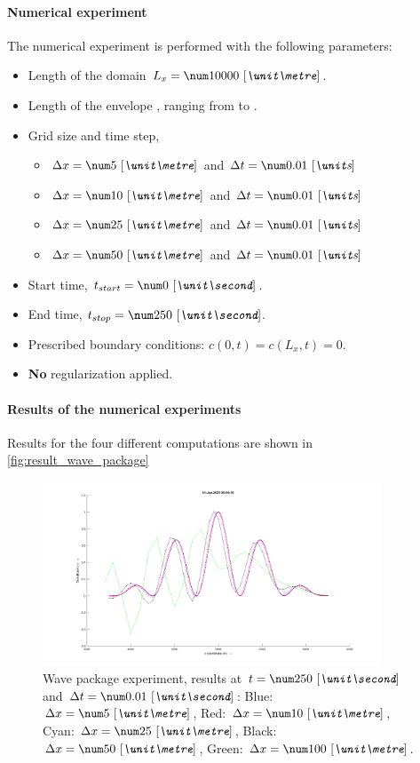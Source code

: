 \paragraph*{Numerical experiment}
The numerical experiment is performed with the following parameters:
\begin{itemize}
    \item Length of the domain $L_x = \bqty{10000}{\metre}$.
    \item Length of the envelope , ranging from  to .
    \item Grid size and time step,
    \begin{itemize}
        \item $\Dx = \bqty{5}{\metre}$ and $\Dt = \bqty{0.01}{s}$
        \item $\Dx = \bqty{10}{\metre}$ and $\Dt = \bqty{0.01}{s}$
        \item $\Dx = \bqty{25}{\metre}$ and $\Dt = \bqty{0.01}{s}$
        \item $\Dx = \bqty{50}{\metre}$ and $\Dt = \bqty{0.01}{s}$
    \end{itemize}
    \item Start time, $t_{start} = \bqty{0}{\second}$.
    \item End time, $t_{stop} = \bqty{250}{\second}$.
    \item Prescribed boundary conditions: $c(0,t) = c(L_x,t) = 0$.
    \item \textbf{No} regularization applied.
\end{itemize}
\paragraph*{Results of the numerical experiments}
Results for the four different computations are shown in \autoref{fig:result_wave_package}
\begin{figure}[H]
    \centering
    \includegraphics[width=0.9\textwidth]{figures/wave_package_250s.png}
    \caption[Wave package experiment]{Wave package experiment, results at $t=\bqty{250}{\second}$ and $\Dt = \bqty{0.01}{\second}$:
        Blue: $\Dx = \bqty{5}{\metre}$,
        Red: $\Dx = \bqty{10}{\metre}$,
        Cyan: $\Dx = \bqty{25}{\metre}$,
        Black: $\Dx = \bqty{50}{\metre}$,
        Green: $\Dx = \bqty{100}{\metre}$.
    }
    \label{fig:result_wave_package}
\end{figure}


